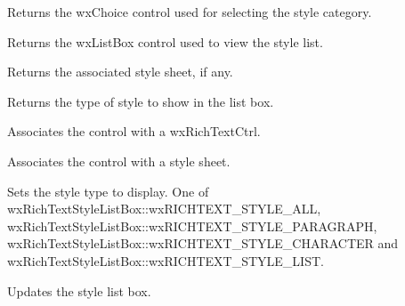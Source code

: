 
Returns the wxChoice control used for selecting the style category.

\label{wxrichtextstylelistctrlgetstylelistbox}


Returns the wxListBox control used to view the style list.

\label{wxrichtextstylelistctrlgetstylesheet}


Returns the associated style sheet, if any.

\label{wxrichtextstylelistctrlgetstyletype}


Returns the type of style to show in the list box.

\label{wxrichtextstylelistctrlsetrichtextctrl}


Associates the control with a wxRichTextCtrl.

\label{wxrichtextstylelistctrlsetstylesheet}


Associates the control with a style sheet.

\label{wxrichtextstylelistctrlsetstyletype}


Sets the style type to display. One of wxRichTextStyleListBox::wxRICHTEXT\_STYLE\_ALL, wxRichTextStyleListBox::wxRICHTEXT\_STYLE\_PARAGRAPH,
wxRichTextStyleListBox::wxRICHTEXT\_STYLE\_CHARACTER and wxRichTextStyleListBox::wxRICHTEXT\_STYLE\_LIST.

\label{wxrichtextstylelistctrlupdatestyles}


Updates the style list box. 

